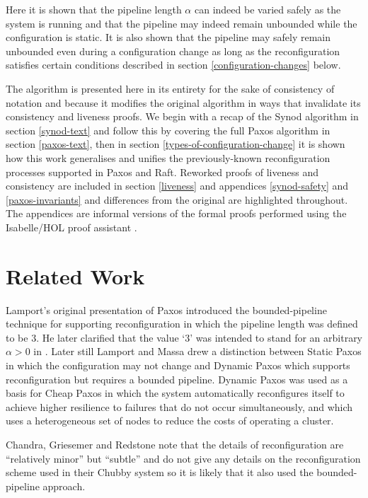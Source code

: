 \documentclass[journal]{IEEEtran}
\begin{document}
Here it is shown that the pipeline length $\alpha$ can indeed be varied safely
as the system is running and that the pipeline may indeed remain unbounded
while the configuration is static. It is also shown that the pipeline may
safely remain unbounded even during a configuration change as long as the
reconfiguration satisfies certain conditions described in section
\ref{configuration-changes} below.

The algorithm is presented here in its entirety for the sake of consistency of
notation and because it modifies the original algorithm in ways that invalidate
its consistency and liveness proofs.  We begin with a recap of the Synod
algorithm in section \ref{synod-text} and follow this by covering the full
Paxos algorithm in section \ref{paxos-text}, then in section
\ref{types-of-configuration-change} it is shown how this work generalises and
unifies the previously-known reconfiguration processes supported in Paxos and
Raft. Reworked proofs of liveness and consistency are included in section
\ref{liveness} and appendices \ref{synod-safety} and \ref{paxos-invariants} and
differences from the original are highlighted throughout. The appendices are
informal versions of the formal proofs performed using the Isabelle/HOL proof
assistant \cite{isabelle-hol}.


\section{Related Work}

Lamport's original presentation of Paxos \cite{part-time-parliament} introduced
the bounded-pipeline technique for supporting reconfiguration in which the
pipeline length was defined to be 3. He later clarified that the value `3' was
intended to stand for an arbitrary $\alpha > 0$ in \cite{paxos-made-simple}.
Later still Lamport and Massa \cite{cheap-paxos} drew a distinction between
Static Paxos in which the configuration may not change and Dynamic Paxos which
supports reconfiguration but requires a bounded pipeline.  Dynamic Paxos was
used as a basis for Cheap Paxos in which the system automatically reconfigures
itself to achieve higher resilience to failures that do not occur
simultaneously, and which uses a heterogeneous set of nodes to reduce the costs
of operating a cluster.

Chandra, Griesemer and Redstone \cite{paxos-made-live} note that the details of
reconfiguration are ``relatively minor'' but ``subtle'' and do not give any
details on the reconfiguration scheme used in their Chubby system so it is
likely that it also used the bounded-pipeline approach.
\end{document}
